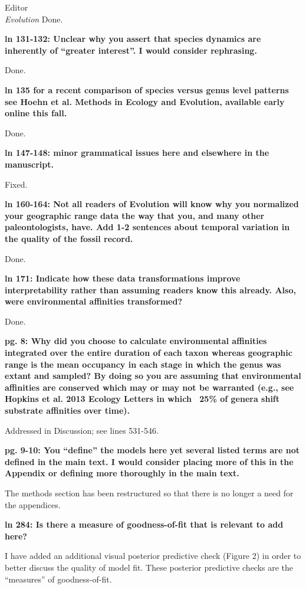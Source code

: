 \documentclass{letter}
\begin{document}
\begin{letter}{Editor \\ \textit{Evolution}}
  Done.

  \textbf{ln 131-132: Unclear why you assert that species dynamics are inherently of “greater interest”. I would consider rephrasing.}

  Done.

  \textbf{ln 135 for a recent comparison of species versus genus level patterns see Hoehn et al. Methods in Ecology and Evolution, available early online this fall.}

  Done.

  \textbf{ln 147-148: minor grammatical issues here and elsewhere in the manuscript.}

  Fixed.

  \textbf{ln 160-164: Not all readers of Evolution will know why you normalized your geographic range data the way that you, and many other paleontologists, have. Add 1-2 sentences about temporal variation in the quality of the fossil record.}

  Done.

  \textbf{ln 171: Indicate how these data transformations improve interpretability rather than assuming readers know this already. Also, were environmental affinities transformed?}

  Done.

  \textbf{pg. 8: Why did you choose to calculate environmental affinities integrated over the entire duration of each taxon whereas geographic range is the mean occupancy in each stage in which the genus was extant and sampled? By doing so you are assuming that environmental affinities are conserved which may or may not be warranted (e.g., see Hopkins et al. 2013 Ecology Letters in which ~25\% of genera shift substrate affinities over time).}

  Addressed in Discussion; see lines 531-546. %

  \textbf{pg. 9-10: You “define” the models here yet several listed terms are not defined in the main text. I would consider placing more of this in the Appendix or defining more thoroughly in the main text.}

  The methods section has been restructured so that there is no longer a need for the appendices.

  \textbf{ln 284: Is there a measure of goodness-of-fit that is relevant to add here?}

  I have added an additional visual posterior predictive check (Figure 2) in order to better discuss the quality of model fit. These posterior predictive checks are the ``measures'' of goodness-of-fit.


\end{letter}
\end{document}
